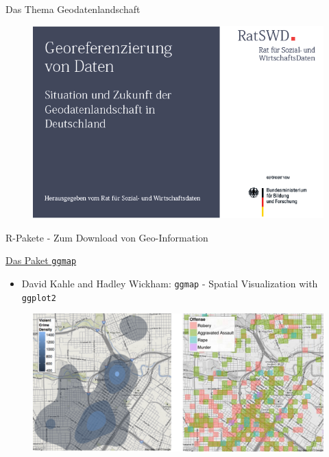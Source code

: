 \documentclass[ignorenonframetext,]{beamer}
\providecommand{\tightlist}{%
  \setlength{\itemsep}{0pt}\setlength{\parskip}{0pt}}
\begin{document}
\begin{frame}{Das Thema Geodatenlandschaft}

\begin{figure}
\centering
\includegraphics{figure/BildRatSWDBericht.png}
\caption{}
\end{figure}

\end{frame}

\begin{frame}[fragile]{R-Pakete - Zum Download von Geo-Information}

\begin{block}{\href{https://sites.google.com/site/davidkahle/ggmap}{Das
Paket \texttt{ggmap}}}

\begin{itemize}
\tightlist
\item
  David Kahle and Hadley Wickham: \texttt{ggmap} - Spatial Visualization
  with \texttt{ggplot2}
\end{itemize}

\begin{figure}
\centering
\includegraphics{figure/Rgeopackages.PNG}
\caption{}
\end{figure}

\end{block}

\end{frame}
\end{document}
